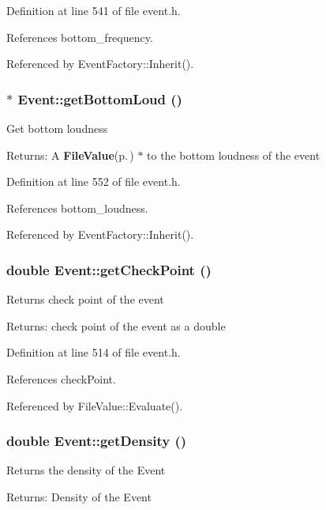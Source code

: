 Definition at line 541 of file event.h.

References bottom\_\-frequency.

Referenced by Event\-Factory::Inherit().
\subsubsection{$\ast$ Event::get\-Bottom\-Loud ()\hspace{0.3cm}{\tt  [inline]}}\label{classEvent_a62}


Get bottom loudness \begin{Desc}
\item[Returns:]A {\bf File\-Value}{\rm (p.\,\pageref{classFileValue})} $\ast$ to the bottom loudness of the event \end{Desc}


Definition at line 552 of file event.h.

References bottom\_\-loudness.

Referenced by Event\-Factory::Inherit().
\subsubsection{\setlength{\rightskip}{0pt plus 5cm}double Event::get\-Check\-Point ()\hspace{0.3cm}{\tt  [inline]}}\label{classEvent_a59}


Returns check point of the event \begin{Desc}
\item[Returns:]check point of the event as a double \end{Desc}


Definition at line 514 of file event.h.

References check\-Point.

Referenced by File\-Value::Evaluate().
\subsubsection{\setlength{\rightskip}{0pt plus 5cm}double Event::get\-Density ()}\label{classEvent_a16}


Returns the density of the Event \begin{Desc}
\item[Returns:]Density of the Event \end{Desc}


